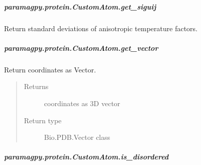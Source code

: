 \documentclass[a4paper,10pt,english,openany,oneside]{sphinxmanual}
\begin{document}
\begin{fulllineitems}
\begin{fulllineitems}
\subparagraph{paramagpy.protein.CustomAtom.get\_siguij}
\label{\detokenize{reference/generated/paramagpy.protein.CustomAtom.get_siguij:paramagpy-protein-customatom-get-siguij}}\label{\detokenize{reference/generated/paramagpy.protein.CustomAtom.get_siguij::doc}}

\begin{fulllineitems}
\label{\detokenize{reference/generated/paramagpy.protein.CustomAtom.get_siguij:paramagpy.protein.CustomAtom.get_siguij}}
Return standard deviations of anisotropic temperature factors.

\end{fulllineitems}



\subparagraph{paramagpy.protein.CustomAtom.get\_vector}
\label{\detokenize{reference/generated/paramagpy.protein.CustomAtom.get_vector:paramagpy-protein-customatom-get-vector}}\label{\detokenize{reference/generated/paramagpy.protein.CustomAtom.get_vector::doc}}

\begin{fulllineitems}
\label{\detokenize{reference/generated/paramagpy.protein.CustomAtom.get_vector:paramagpy.protein.CustomAtom.get_vector}}
Return coordinates as Vector.
\begin{quote}\begin{description}
\item[{Returns}] \leavevmode
coordinates as 3D vector

\item[{Return type}] \leavevmode
Bio.PDB.Vector class

\end{description}\end{quote}

\end{fulllineitems}



\subparagraph{paramagpy.protein.CustomAtom.is\_disordered}
\label{\detokenize{reference/generated/paramagpy.protein.CustomAtom.is_disordered:paramagpy-protein-customatom-is-disordered}}\label{\detokenize{reference/generated/paramagpy.protein.CustomAtom.is_disordered::doc}}


\end{fulllineitems}
\end{fulllineitems}
\end{document}
